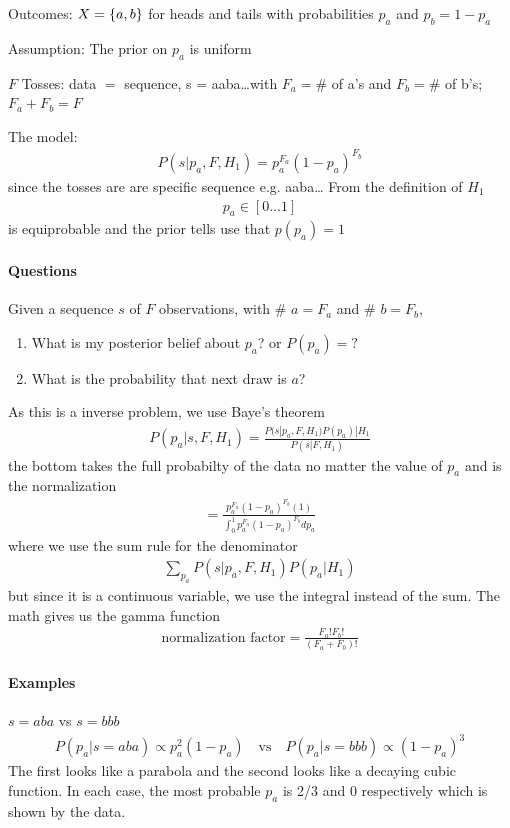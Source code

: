\documentclass[../main.tex]{subfiles}
\begin{document}
Outcomes: $X = \qt{a, b}$ for heads and tails with probabilities $p_a$ and $p_b = 1 - p_a$

Assumption: The prior on $p_a$ is uniform

$F$ Tosses: data $=$ sequence, s = aaba\dots with $F_a = \#$ of a's and $F_b = \#$ of b's; 
$F_a + F_b = F$

The model:
\begin{align*}
    P(s| p_a, F, H_1) = p_a^{F_a} (1-p_a)^{F_b}
\end{align*}
since the tosses are are specific sequence e.g. {aaba\dots} From the definition of $H_1$
\begin{align*}
    p_a \in [0\dots 1]
\end{align*}
is equiprobable and the prior tells use that $p(p_a) = 1$

\paragraph{Questions} Given a sequence $s$ of $F$ observations, with \# $a= F_a$ and \# $b = F_b$,
\begin{enumerate}
    \item What is my posterior belief about $p_a$? or $P(p_a)= ?$
    \item What is the probability that next draw is $a$?
\end{enumerate}
As this is a inverse problem, we use Baye's theorem
\begin{align*}
    P(p_a|s, F, H_1) = \frac{P(s|p_a, F, H_1) P(p_a)| H_1}{P(s | F, H_1)}
\end{align*}
the bottom takes the full probabilty of the data no matter the value of $p_a$ and is the normalization
\begin{align*}
    = \frac{p_a^{F_a} (1-p_a)^{F_b}(1)}{\int_0^1 p_a^{F_a} (1-p_a)^{F_b} dp_a}
\end{align*}
where we use the sum rule for the denominator
\begin{align*}
    \sum_{p_a} P(s|p_a, F, H_1) P(p_a|H_1)
\end{align*}
but since it is a continuous variable, we use the integral instead of the sum. The math gives us the
gamma function
\begin{align*}
    \textrm{normalization factor} = \frac{F_a! F_b!}{(F_a + F_b)!}
\end{align*}

\paragraph{Examples} $s = aba$ vs $s = bbb$
\begin{align*}
    P(p_a| s = aba) \propto p_a^2 (1-p_a) \quad \textrm{vs} \quad P(p_a| s = bbb) \propto (1-p_a)^3
\end{align*}
The first looks like a parabola and the second looks like a decaying cubic function. In each case,
the most probable $p_a$ is 2/3 and 0 respectively which is shown by the data.
\end{document}

